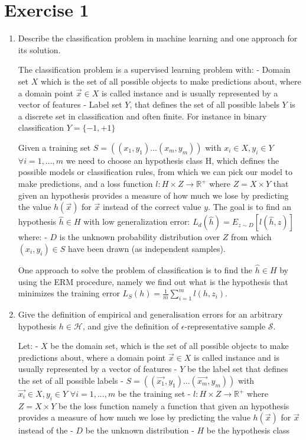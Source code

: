 \documentclass[a4paper,11pt,oneside]{book}
\begin{document}
\section{Exercise 1}
    \begin{enumerate}
        \item Describe the classification problem in machine learning and one approach for its solution.
            \begin{solution}
                The classification problem is a supervised learning problem with:
                - Domain set $X$ which is the set of all possible objects to make predictions about, where a domain point $\vec{x} \in X$ is called instance and is usually represented by a vector of features
                - Label set $Y$, that defines the set of all possible labels $Y$ is a discrete set in classification and often finite. For instance in binary classification $Y = \{-1,+1\}$
                
                Given a training set $S = ((x_1,y_1)...(x_m,y_m))$ with $x_i \in X, y_i \in Y$ $\forall i = 1,...,m$ we need to choose an hypothesis class H, which defines the possible models or classification rules, from which we can pick our model to make predictions, and a loss function $l: H\times Z \to \mathbb{R}^+$ where $Z = X\times Y$ that given an hypothesis provides a measure of how much we lose by predicting the value $h(\vec{x})$ for $\vec{x}$ instead of the correct value $y$.
                The goal is to find an hypothesis $\hat{h} \in H$ with low generalization error: $L_d(\hat{h}) = E_{z\sim D}[l(\hat{h},z)]$ where:
                - $D$ is the unknown probability distribution over $Z$ from which $(x_i,y_i) \in S$ have been drawn (as independent samples).
                
                One approach to solve the problem of classification is to find the $\hat{h} \in H$ by using the ERM procedure, namely we find out what is the hypothesis that minimizes the training error $L_S(h) = \frac{1}{m}\sum_{i=1}^m l(h,z_i)$.
            \end{solution}
        \clearpage
        \item Give the definition of empirical and generalisation errors for an arbitrary hypothesis $h \in \mathcal{H}$, and give the definition of $\epsilon$-representative sample $\mathcal{S}$.
            \begin{solution}
                Let:
                - $X$ be the domain set, which is the set of all possible objects to make predictions about, where a domain point $\vec{x} \in X$ is called instance and is usually represented by a vector of features
                - $Y$ be the label set that defines the set of all possible labels
                - $S = ((\vec{x_1},y_1)...(\vec{x_m},y_m))$ with $\vec{x_i} \in X, y_i \in Y$ $\forall i = 1,...,m$ be the training set
                - $l: H\times Z \to \mathbb{R}^+$ where $Z = X\times Y$ be the loss function namely a function that given an hypothesis provides a measure of how much we lose by predicting the value $h(\vec{x})$ for $\vec{x}$ instead of the
                - $D$ be the unknown distribution
                - $H$ be the hypothesis class
                

\end{solution}
\end{enumerate}
\end{document}
